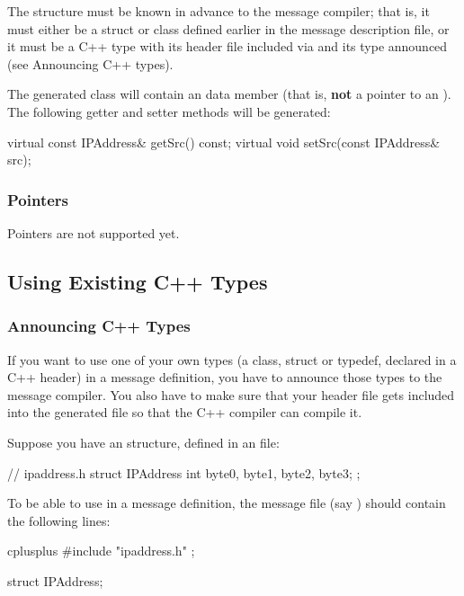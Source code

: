The  structure must be known in advance to the message compiler;
that is, it must either be a struct or class defined earlier in the message
description file, or it must be a C++ type with its header file
included via  and its type announced
(see Announcing C++ types).

The generated class will contain an  data member
(that is, \textbf{not} a pointer to an ).
The following getter and setter methods will be generated:

\begin{cpp}
virtual const IPAddress& getSrc() const;
virtual void setSrc(const IPAddress& src);
\end{cpp}


\subsubsection{Pointers}

Pointers are not supported yet.



\subsection{Using Existing C++ Types}


\subsubsection{Announcing C++ Types}

If you want to use one of your own types (a class, struct or typedef,
declared in a C++ header) in a message definition, you have to
announce those types to the message compiler. You also have to make sure
that your header file gets included into the generated  file
so that the C++ compiler can compile it.

Suppose you have an  structure, defined in an 
file:

\begin{cpp}
// ipaddress.h
struct IPAddress {
    int byte0, byte1, byte2, byte3;
};
\end{cpp}

To be able to use  in a message definition, the message
file (say ) should contain the following lines:

\begin{msg}
cplusplus {{
#include "ipaddress.h"
}};

struct IPAddress;
\end{msg}

